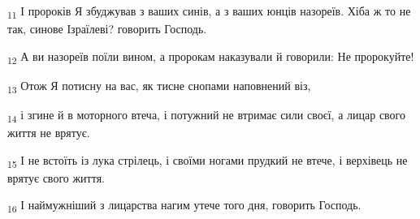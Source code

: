 \begin{tcolorbox}
\textsubscript{11} І пророків Я збуджував з ваших синів, а з ваших юнців назореїв. Хіба ж то не так, синове Ізраїлеві? говорить Господь.
\end{tcolorbox}
\begin{tcolorbox}
\textsubscript{12} А ви назореїв поїли вином, а пророкам наказували й говорили: Не пророкуйте!
\end{tcolorbox}
\begin{tcolorbox}
\textsubscript{13} Отож Я потисну на вас, як тисне снопами наповнений віз,
\end{tcolorbox}
\begin{tcolorbox}
\textsubscript{14} і згине й в моторного втеча, і потужний не втримає сили своєї, а лицар свого життя не врятує.
\end{tcolorbox}
\begin{tcolorbox}
\textsubscript{15} І не встоїть із лука стрілець, і своїми ногами прудкий не втече, і верхівець не врятує свого життя.
\end{tcolorbox}
\begin{tcolorbox}
\textsubscript{16} І наймужніший з лицарства нагим утече того дня, говорить Господь.
\end{tcolorbox}

